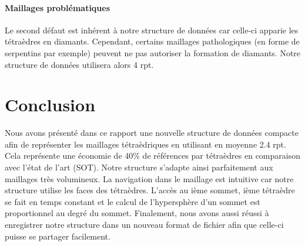 \paragraph{Maillages problématiques}Le second défaut est inhérent à notre structure de données car celle-ci apparie les tétraèdres en diamants. Cependant, certains maillages pathologiques (en forme de serpentins par exemple) peuvent ne pas autoriser la formation de diamants. Notre structure de données utilisera alors 4 rpt.

\section{Conclusion}
\noindent
Nous avons présenté dans ce rapport une nouvelle structure de données compacte afin de représenter les maillages tétraèdriques en utilisant en moyenne 2.4 rpt. Cela représente une économie de 40\% de références par tétraèdres en comparaison avec l'état de l'art (SOT). Notre structure s'adapte ainsi parfaitement aux maillages très volumineux. La navigation dans le maillage est intuitive car notre structure utilise les faces des tétraèdres. L'accès au ième sommet, ième tétraèdre se fait en temps constant et le calcul de l'hypersphère d'un sommet est proportionnel au degré du sommet. Finalement, nous avons aussi réussi à enregistrer notre structure dans un nouveau format de fichier afin que celle-ci puisse se partager facilement.